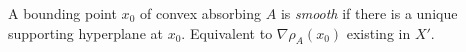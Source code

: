A bounding point $x_0$ of convex absorbing $A$ is \emph{smooth} if there is a unique supporting hyperplane at $x_0$. Equivalent to $\nabla\rho_A(x_0)$ existing in $X'$.
